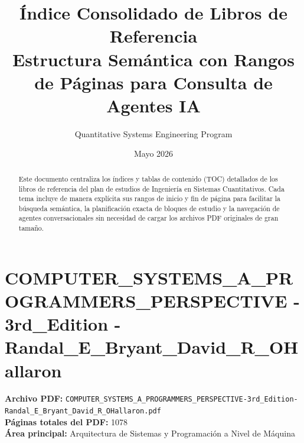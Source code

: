 \documentclass[11pt,a4paper]{article}
\title{Índice Consolidado de Libros de Referencia\\ \large Estructura Semántica con Rangos de Páginas para Consulta de Agentes IA}
\author{Quantitative Systems Engineering Program}
\date{Mayo 2026}
\begin{document}
\maketitle

\begin{abstract}
Este documento centraliza los índices y tablas de contenido (TOC) detallados de los libros de referencia del plan de estudios de Ingeniería en Sistemas Cuantitativos. Cada tema incluye de manera explícita sus rangos de inicio y fin de página para facilitar la búsqueda semántica, la planificación exacta de bloques de estudio y la navegación de agentes conversacionales sin necesidad de cargar los archivos PDF originales de gran tamaño.
\end{abstract}

\tableofcontents
\newpage

\section{COMPUTER\_SYSTEMS\_A\_PROGRAMMERS\_PERSPECTIVE - 3rd\_Edition - Randal\_E\_Bryant\_David\_R\_OHallaron}
\textbf{Archivo PDF:} \texttt{COMPUTER\_SYSTEMS\_A\_PROGRAMMERS\_PERSPECTIVE-3rd\_Edition-Randal\_E\_Bryant\_David\_R\_OHallaron.pdf} \\
\textbf{Páginas totales del PDF:} 1078 \\
\textbf{Área principal:} Arquitectura de Sistemas y Programación a Nivel de Máquina
\end{document}
